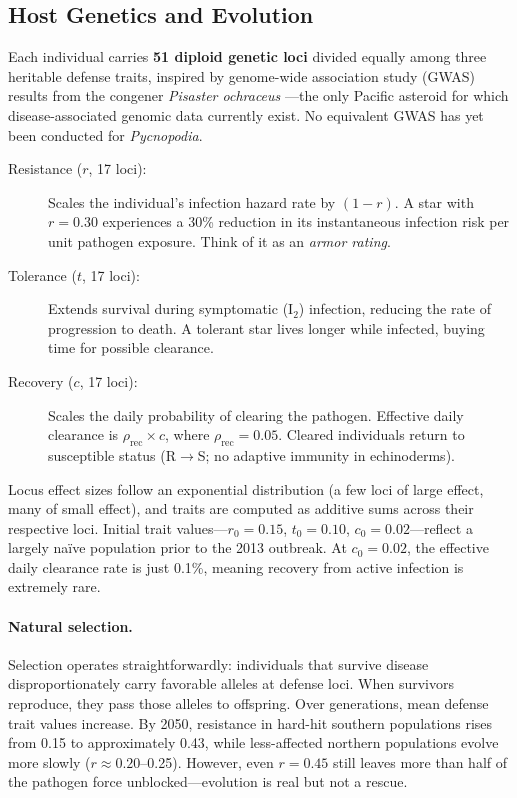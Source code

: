 \subsection{Host Genetics and Evolution}
\label{sec:host_genetics}

Each individual carries \textbf{51 diploid genetic loci} divided equally
among three heritable defense traits, inspired by genome-wide association study (GWAS) results from the
congener \textit{Pisaster ochraceus} \citep{schiebelhut2018}---the only
Pacific asteroid for which disease-associated genomic data currently exist.
No equivalent GWAS has yet been conducted for \textit{Pycnopodia}.

\begin{description}
  \item[Resistance ($r$, 17 loci):] Scales the individual's infection
    hazard rate by $(1-r)$.  A star with $r = 0.30$ experiences a 30\%
    reduction in its instantaneous infection risk per unit pathogen
    exposure.  Think of it as an \textit{armor rating}.

  \item[Tolerance ($t$, 17 loci):] Extends survival during symptomatic
    (I$_2$) infection, reducing the rate of progression to death.  A
    tolerant star lives longer while infected, buying time for possible
    clearance.

  \item[Recovery ($c$, 17 loci):] Scales the daily probability of
    clearing the pathogen.  Effective daily clearance is
    $\rho_\mathrm{rec} \times c$, where $\rho_\mathrm{rec} = 0.05$.
    Cleared individuals return to susceptible status (R$\to$S; no
    adaptive immunity in echinoderms).
\end{description}

Locus effect sizes follow an exponential distribution (a few loci of large
effect, many of small effect), and traits are computed as additive sums
across their respective loci.  Initial trait values---$r_0 = 0.15$,
$t_0 = 0.10$, $c_0 = 0.02$---reflect a largely na\"ive population prior to
the 2013 outbreak.  At $c_0 = 0.02$, the effective daily clearance rate is
just 0.1\%, meaning recovery from active infection is extremely rare.

\paragraph{Natural selection.}
Selection operates straightforwardly: individuals that survive disease
disproportionately carry favorable alleles at defense loci.  When survivors
reproduce, they pass those alleles to offspring.  Over generations, mean
defense trait values increase.  By 2050, resistance in hard-hit southern
populations rises from 0.15 to approximately 0.43, while
less-affected northern populations evolve more slowly ($r \approx 0.20$--0.25).
However, even $r = 0.45$ still leaves more than half of the pathogen force
unblocked---evolution is real but not a rescue.

